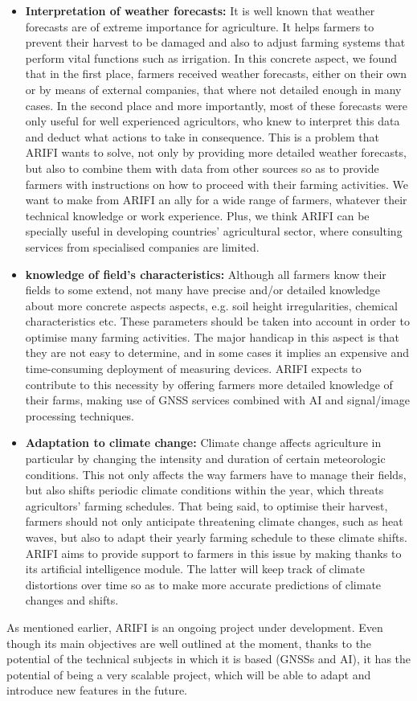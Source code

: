 \begin{itemize}
    \item \textbf{Interpretation of weather forecasts:} It is well known that weather forecasts are of extreme importance for agriculture. It helps farmers to prevent their harvest to be damaged and also to adjust farming systems that perform vital functions such as irrigation. In this concrete aspect, we found
    that in the first place, farmers received weather forecasts, either on their own or by means of external companies, that where not detailed enough in many cases. In the second place and more importantly, most of these forecasts were only useful for well experienced agricultors, who knew to interpret this data and deduct what actions to take in consequence. This is a problem that ARIFI wants to solve, not only by providing more detailed weather forecasts, but also to combine them with data from other sources so as to provide farmers with instructions on how to proceed with their farming activities. We want to make from ARIFI an ally for a wide range of farmers, whatever their technical knowledge or work experience. Plus, we think ARIFI can be specially useful in developing countries' agricultural sector, where consulting services from specialised companies are limited. 
    \item \textbf{knowledge of field's characteristics:} Although all farmers know their fields to some extend, not many have precise and/or detailed knowledge about more concrete aspects aspects, e.g. soil height irregularities, chemical characteristics etc. These parameters should be taken into account in order to optimise many farming activities. The major handicap in this aspect is that they are not easy to determine, and in some cases it implies an expensive and time-consuming deployment of measuring devices. ARIFI expects to contribute to this necessity by offering farmers more detailed knowledge of their farms, making use of GNSS services combined with AI and signal/image processing techniques.
    \item \textbf{Adaptation to climate change:} Climate change affects agriculture in particular by changing the intensity and duration of certain meteorologic conditions. This not only affects the way farmers have to manage their fields, but also shifts periodic climate conditions within the year, which threats agricultors' farming schedules. That being said, to optimise their harvest, farmers should not only anticipate threatening climate changes, such as heat waves, but also to adapt their yearly farming schedule to these climate shifts.
    ARIFI aims to provide support to farmers in this issue by making thanks to its artificial intelligence module. The latter will keep track of climate distortions over time so as to make more accurate predictions of climate changes and shifts.  
\end{itemize}
As mentioned earlier, ARIFI is an ongoing project under development. Even though its main objectives are well outlined at the moment, thanks to the potential of the technical subjects in which it is based (GNSSs and AI), it has the potential of being a very scalable project, which will be able to adapt and introduce new features in the future.

